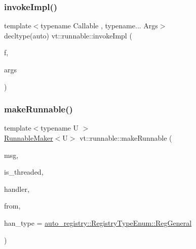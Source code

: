 \mbox{\label{namespacevt_1_1runnable_af14b1c72fc3bf8437c2b89021af7eecf}} 
\subsubsection{\texorpdfstring{invoke\+Impl()}{invokeImpl()}\hspace{0.1cm}{\footnotesize\ttfamily [2/2]}}
{\footnotesize\ttfamily template$<$typename Callable , typename... Args$>$ \\
decltype(auto) vt\+::runnable\+::invoke\+Impl (\begin{DoxyParamCaption}\item[{Callable \&\&}]{f,  }\item[{Args \&\&...}]{args }\end{DoxyParamCaption})}

\mbox{\label{namespacevt_1_1runnable_aade55dc0d7ad5a73d2ff54e68ddfcea5}} 
\subsubsection{\texorpdfstring{make\+Runnable()}{makeRunnable()}}
{\footnotesize\ttfamily template$<$typename U $>$ \\
\hyperlink{structvt_1_1runnable_1_1_runnable_maker}{Runnable\+Maker}$<$U$>$ vt\+::runnable\+::make\+Runnable (\begin{DoxyParamCaption}\item[{\hyperlink{namespacevt_ab2b3d506ec8e8d1540aede826d84a239}{Msg\+Shared\+Ptr}$<$ U $>$ const \&}]{msg,  }\item[{bool}]{is\+\_\+threaded,  }\item[{\hyperlink{namespacevt_af64846b57dfcaf104da3ef6967917573}{Handler\+Type}}]{handler,  }\item[{\hyperlink{namespacevt_a866da9d0efc19c0a1ce79e9e492f47e2}{Node\+Type}}]{from,  }\item[{\hyperlink{namespacevt_1_1auto__registry_a9f369ca2b484130b396729e2ddf05241}{auto\+\_\+registry\+::\+Registry\+Type\+Enum}}]{han\+\_\+type = {\ttfamily \hyperlink{namespacevt_1_1auto__registry_a9f369ca2b484130b396729e2ddf05241aed767d8e868d24805af30efeb716d412}{auto\+\_\+registry\+::\+Registry\+Type\+Enum\+::\+Reg\+General}} }\end{DoxyParamCaption})}



